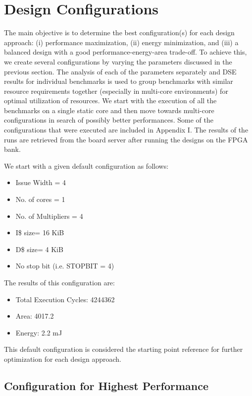\documentclass[conference]{IEEEtran}
\begin{document}
\section{Design Configurations}

The main objective is to determine the best configuration(s) for each design approach: (i) performance maximization, (ii) energy minimization, and (iii) a balanced design with a good performance-energy-area trade-off. To achieve this, we create several configurations by varying the parameters discussed in the previous section. The analysis of each of the parameters separately and DSE results for individual benchmarks is used to group benchmarks with similar resource requirements together (especially in multi-core environments) for optimal utilization of resources. We start with the execution of all the benchmarks on a single static core and then move towards multi-core configurations in search of possibly better performances. Some of the configurations that were executed are included in Appendix I. The results of the runs are retrieved from the board server after running the designs on the FPGA bank.

We start with a given default configuration as follows:
\begin{itemize}
    \item Issue Width = 4
    \item No. of cores = 1
    \item No. of Multipliers = 4
    \item I\$ size= 16 KiB
    \item D\$ size= 4 KiB
    \item No stop bit (i.e. STOPBIT = 4)
\end{itemize}

The results of this configuration are:
\begin{itemize}
\item Total Execution Cycles: 4244362
\item Area: 4017.2
\item Energy: 2.2 mJ
\end{itemize}
This default configuration is considered the starting point reference for further optimization for each design approach.

\subsection{Configuration for Highest Performance}
\end{document}
